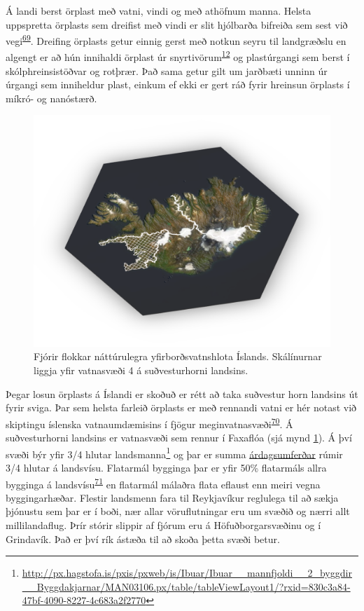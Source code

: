\documentclass[icelandic,]{book}
\let\rmarkdownfootnote\footnote%
\def\footnote{\protect\rmarkdownfootnote}
\begin{document}
Á landi berst örplast með vatni, vindi og með athöfnum manna. Helsta uppspretta örplasts sem dreifist með vindi er slit hjólbarða bifreiða sem sest við vegi\textsuperscript{\protect\hyperlink{ref-Cadle1978}{69}}. Dreifing örplasts getur einnig gerst með notkun seyru til landgræðslu en algengt er að hún innihaldi örplast úr snyrtivörum\textsuperscript{\protect\hyperlink{ref-zitko1991another}{12}} og plastúrgangi sem berst í skólphreinsistöðvar og rotþrær. Það sama getur gilt um jarðbæti unninn úr úrgangi sem inniheldur plast, einkum ef ekki er gert ráð fyrir hreinsun örplasts í míkró- og nanóstærð.

\begin{figure}[H]

{\centering \includegraphics[width=1\linewidth]{myndir/map} 

}

\caption{Fjórir flokkar náttúrulegra yfirborðsvatnshlota Íslands. Skálínurnar liggja yfir vatnasvæði 4 á suðvesturhorni landsins.}\label{fig:vatnasvidsv}
\end{figure}

Þegar losun örplasts á Íslandi er skoðuð er rétt að taka suðvestur horn landsins út fyrir sviga. Þar sem helsta farleið örplasts er með rennandi vatni er hér notast við skiptingu íslenska vatnaumdæmisins í fjögur meginvatnasvæði\textsuperscript{\protect\hyperlink{ref-Bj2012}{70}}. Á suðvesturhorni landsins er vatnasvæði sem rennur í Faxaflóa (sjá mynd \ref{fig:vatnasvidsv}). Á því svæði býr yfir 3/4 hlutar landsmanna\footnote{\url{http://px.hagstofa.is/pxis/pxweb/is/Ibuar/Ibuar__mannfjoldi__2_byggdir__Byggdakjarnar/MAN03106.px/table/tableViewLayout1/?rxid=830c3a84-47bf-4090-8227-4c683a2f2770}} og þar er summa \href{http://www.vegagerdin.is/upplysingar-og-utgafa/umferdin/adferdarfraedi-talninga/}{árdagsumferðar} rúmir 3/4 hlutar á landsvísu. Flatarmál bygginga þar er yfir 50\% flatarmáls allra bygginga á landsvísu\textsuperscript{\protect\hyperlink{ref-OpenStreetMap}{71}} en flatarmál málaðra flata eflaust enn meiri vegna byggingarhæðar. Flestir landsmenn fara til Reykjavíkur reglulega til að sækja þjónustu sem þar er í boði, nær allar vöruflutningar eru um svæðið og nærri allt millilandaflug. Þrír stórir slippir af fjórum eru á Höfuðborgarsvæðinu og í Grindavík. Það er því rík ástæða til að skoða þetta svæði betur.
\end{document}
